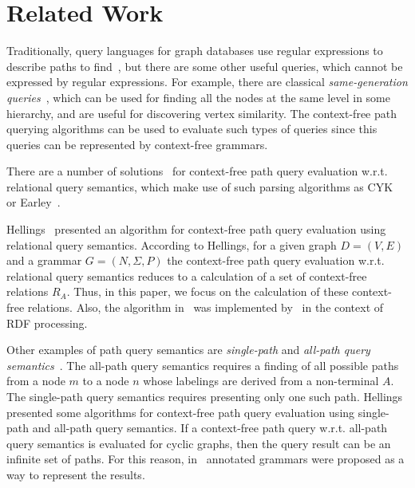 \section{Related Work}
\label{section_related}

Traditionally, query languages for graph databases use regular expressions to describe paths to find~\cite{reutter2017regular, fan2011adding, abiteboul1997regular, nole2016regular, graphDB}, but there are some other useful queries, which cannot be expressed by regular expressions. For example, there are classical \emph{same-generation queries}~\cite{FndDB}, which can be used for finding all the nodes at the same level in some hierarchy, and are useful for discovering vertex similarity. The context-free path querying algorithms can be used to evaluate such types of queries since this queries can be represented by context-free grammars.  

There are a number of solutions~\cite{hellingsRelational, GraphQueryWithEarley, RDF} for context-free path query evaluation w.r.t. relational query semantics, which make use of such parsing algorithms as CYK~\cite{kasami, younger} or Earley~\cite{Grune}.

Hellings~\cite{hellingsRelational} presented an algorithm for context-free path query evaluation using relational query semantics. According to Hellings, for a given graph \mbox{$D = (V, E)$} and a grammar $G = (N, \Sigma, P)$ the context-free path query evaluation w.r.t. relational query semantics reduces to a calculation of a set of context-free relations $R_A$. Thus, in this paper, we focus on the calculation of these context-free relations. Also, the algorithm in~\cite{hellingsRelational} was implemented by~\cite{RDF} in the context of RDF processing.

Other examples of path query semantics are \emph{single-path} and \emph{all-path query semantics}~\cite{hellingsPathQuerying}. The all-path query semantics requires a finding of all possible paths from a node $m$ to a node $n$ whose labelings are derived from a non-terminal $A$. The single-path query semantics requires presenting only one such path. Hellings~\cite{hellingsPathQuerying} presented some algorithms for context-free path query evaluation using single-path and all-path query semantics. If a context-free path query w.r.t. all-path query semantics is evaluated for cyclic graphs, then the query result can be an infinite set of paths. For this reason, in~\cite{hellingsPathQuerying} annotated grammars were proposed as a way to represent the results.

